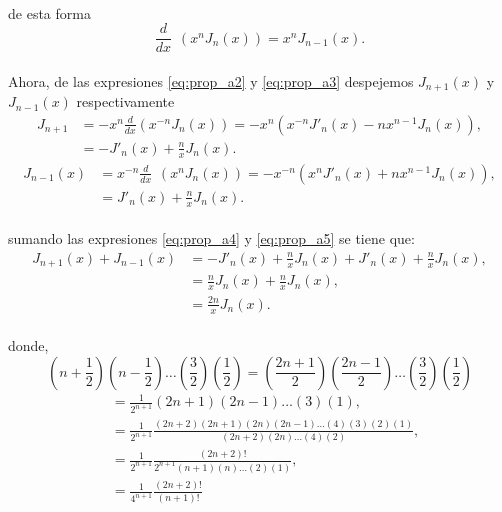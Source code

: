 \documentclass{article}
\begin{document}
\paragraph{}de esta forma
\begin{equation}
\frac{d}{dx} \hspace{5pt} (x^n J_n(x)) = x^n J_{n-1}(x) \label{eq:prop_a3}.
\end{equation}
\paragraph{} Ahora, de las expresiones \eqref{eq:prop_a2} y \eqref{eq:prop_a3} despejemos $J_{n+1}(x)$ y $J_{n-1}(x)$ respectivamente
\begin{align}
J_{n+1} &= -x^n \frac{d}{dx} (x^{-n} J_n(x))
= -x^n(x^{-n}J'_n(x) - n x^{n-1} J_n(x)),\\
&= -J'_n(x) + \frac{n}{x} J_n(x) \label{eq:prop_a4}.
\end{align}
\begin{align}
J_{n-1}(x) &= x^{-n} \frac{d}{dx} \hspace{5pt} (x^n J_n(x))
= -x^{-n}(x^n J'_n(x) + nx^{n-1}J_n(x)),\\
&= J'_n(x) + \frac{n}{x} J_n(x)\label{eq:prop_a5}.
\end{align}
\paragraph{}sumando las expresiones \eqref{eq:prop_a4} y \eqref{eq:prop_a5} se tiene que:
\begin{align}
J_{n+1}(x) + J_{n-1}(x) &= -J'_n(x) + \frac{n}{x} J_n(x) + J'_n(x) + \frac{n}{x} J_n(x),\\
&= \frac{n}{x} J_n(x) + \frac{n}{x} J_n(x),\\
&= \frac{2n}{x} J_n(x) \label{eq:prop_a6}.
\end{align}
\paragraph{}donde,
$$
\left(n+\frac{1}{2}\right)
\left(n-\frac{1}{2}\right)
\dots
\left(\frac{3}{2}\right)
\left(\frac{1}{2}\right)
=
\left(\frac{2n + 1}{2}\right)
\left(\frac{2n - 1}{2}\right)
\dots
\left(\frac{3}{2}\right)
\left(\frac{1}{2}\right)
$$
\begin{align*}
&= \frac{1}{2^{n+1}} (2n+1)(2n-1)\dots(3)(1),\\
&= \frac{1}{2^{n+1}} \frac{(2n+2)(2n+1)(2n)(2n-1)\dots(4)(3)(2)(1)}{(2n+2)(2n)\dots(4)(2)},\\
&= \frac{1}{2^{n+1}} \frac{(2n+2)!}{2^{n+1}(n+1)(n)\dots(2)(1)},\\
&= \frac{1}{4^{n+1}} \frac{(2n+2)!}{(n+1)!}
\end{align*}
\end{document}
